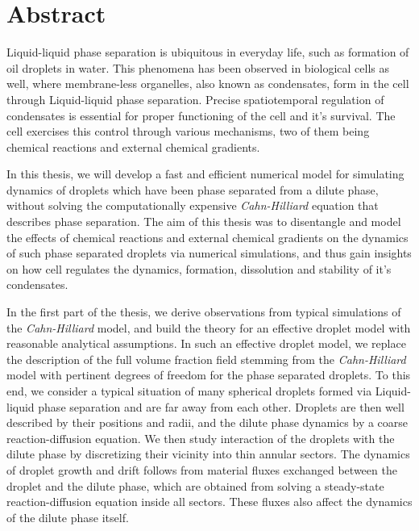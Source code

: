 \chapter*{Abstract}
\label{chap:Abstract}


Liquid-liquid phase separation is ubiquitous in everyday life, such as formation of oil droplets in water.
This phenomena has been observed in biological cells as well, where membrane-less organelles, also known as condensates, form in the cell through Liquid-liquid phase separation.
Precise spatiotemporal regulation of condensates is essential for proper functioning of the cell and it's survival.
The cell exercises this control through various mechanisms, two of them being chemical reactions and external chemical gradients.

In this thesis, we will develop a fast and efficient numerical model for simulating dynamics of droplets which have been phase separated from a dilute phase, without solving the computationally expensive \textit{Cahn-Hilliard} equation that describes phase separation.
The aim of this thesis was to disentangle and model the effects of chemical reactions and external chemical gradients on the dynamics of such phase separated droplets via numerical simulations, and thus gain insights on how cell regulates the dynamics, formation, dissolution and stability of it's condensates.

In the first part of the thesis, we derive observations from typical simulations of the \textit{Cahn-Hilliard} model, and build the theory for an effective droplet model with reasonable analytical assumptions.
In such an effective droplet model, we replace the description of the full volume fraction field stemming from the \textit{Cahn-Hilliard} model with pertinent degrees of freedom for the phase separated droplets.
To this end, we consider a typical situation of many spherical droplets formed via Liquid-liquid phase separation and are far away from each other.
Droplets are then well described by their positions and radii, and the dilute phase dynamics by a coarse reaction-diffusion equation.
We then study interaction of the droplets with the dilute phase by discretizing their vicinity into thin annular sectors.
The dynamics of droplet growth and drift follows from material fluxes exchanged between the droplet and the dilute phase, which are obtained from solving a steady-state reaction-diffusion  equation inside all sectors.
These fluxes also affect the dynamics of the dilute phase itself.

